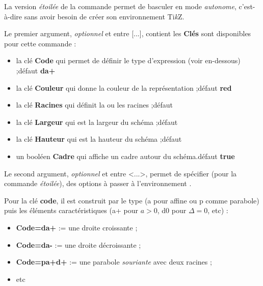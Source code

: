\documentclass[a4paper,french,11pt]{article}
\providecommand\tikzlogo{Ti\textit{k}Z}
\let\TikZ\tikzlogo
\newcommand\ctex[1]{\tcbox[vignettelatex]{#1}}
\newcommand\cmaj[1]{%
	{\tcbox[vignetteMaJ]{#1}\xspace}%
}
\newcommand\Cle[1]{{\bfseries\sffamily\textlangle #1\textrangle}}
\begin{document}
\begin{codecles}
\cmaj{2.1.9} La version \textit{étoilée} de la commande permet de basculer en mode \textit{autonome}, c'est-à-dire sans avoir besoin de créer son environnement \TikZ.

\smallskip

Le premier argument, \textit{optionnel} et entre \textsf{[...]}, contient les \Cle{Clés} sont disponibles pour cette commande :

\begin{itemize}
	\item la clé \Cle{Code} qui permet de définir le type d'expression (voir en-dessous) ;\hfill{}défaut \Cle{da+}
	\item la clé \Cle{Couleur} qui donne la couleur de la représentation ;\hfill{}défaut \Cle{red}
	\item la clé \Cle{Racines} qui définit la ou les racines ;\hfill{}défaut \Cle{2}
	\item la clé \Cle{Largeur} qui est la largeur du schéma ;\hfill{}défaut \Cle{2}
	\item la clé \Cle{Hauteur} qui est la hauteur du schéma ;\hfill{}défaut \Cle{1}
	\item un booléen \Cle{Cadre} qui affiche un cadre autour du schéma.\hfill{}défaut \Cle{true}
\end{itemize}

Le second argument, \textit{optionnel} et entre \textsf{<...>}, permet de spécifier (pour la commande \textit{étoilée}), des options à passer à l'environnement \ctex{tikzpicture}.
\end{codecles}

\begin{codecles}
Pour la clé \Cle{code}, il est construit par le type (\textsf{a} pour affine ou \textsf{p} comme parabole) puis les éléments caractéristiques (\textsf{a+} pour $a>0$, \textsf{d0} pour $\Delta=0$, etc) :

\begin{itemize}
	\item \Cle{Code=da+} := une droite croissante ;
	\item \Cle{Code=da-} := une droite décroissante ;
	\item \Cle{Code=pa+d+} := une parabole \textit{souriante} avec deux racines ;
	\item etc
\end{itemize}
\end{codecles}

\pagebreak
\end{document}
